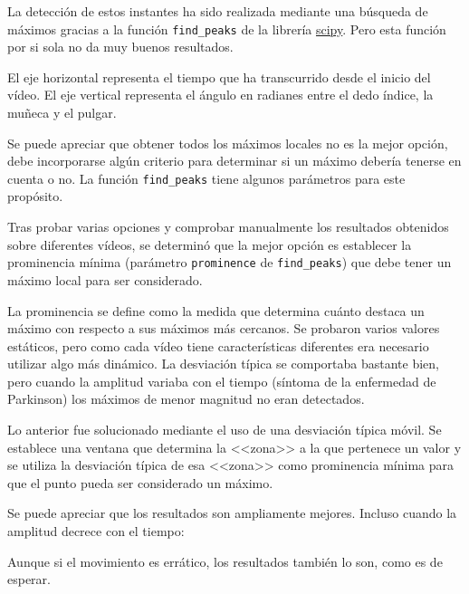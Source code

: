 La detección de estos instantes ha sido realizada mediante una búsqueda de
máximos gracias a la función \texttt{find\_peaks} de la librería
\href{https://scipy.org/}{scipy}. Pero esta función por si sola no da muy buenos
resultados.


El eje horizontal representa el tiempo que ha transcurrido desde el inicio del
vídeo. El eje vertical representa el ángulo en radianes entre el dedo índice, la
muñeca y el pulgar.

Se puede apreciar que obtener todos los máximos locales no es la mejor opción,
debe incorporarse algún criterio para determinar si un máximo debería tenerse en
cuenta o no. La función \texttt{find\_peaks} tiene algunos parámetros para este
propósito.

Tras probar varias opciones y comprobar manualmente los resultados obtenidos
sobre diferentes vídeos, se determinó que la mejor opción es establecer la
prominencia mínima (parámetro \texttt{prominence} de \texttt{find\_peaks}) que debe tener
un máximo local para ser considerado.

La prominencia se define como la medida que determina cuánto destaca un máximo
con respecto a sus máximos más cercanos. Se probaron varios valores estáticos,
pero como cada vídeo tiene características diferentes era necesario utilizar
algo más dinámico. La desviación típica se comportaba bastante bien, pero cuando
la amplitud variaba con el tiempo (síntoma de la enfermedad de Parkinson) los
máximos de menor magnitud no eran detectados.

Lo anterior fue solucionado  mediante el uso de una desviación típica móvil. Se
establece una ventana que determina la <<zona>> a la que pertenece un valor y se
utiliza la desviación típica de esa <<zona>> como prominencia mínima para que el
punto pueda ser considerado un máximo.


Se puede apreciar que los resultados son ampliamente mejores. Incluso cuando la
amplitud decrece con el tiempo:


Aunque si el movimiento es errático, los resultados también lo son, como es de
esperar.

